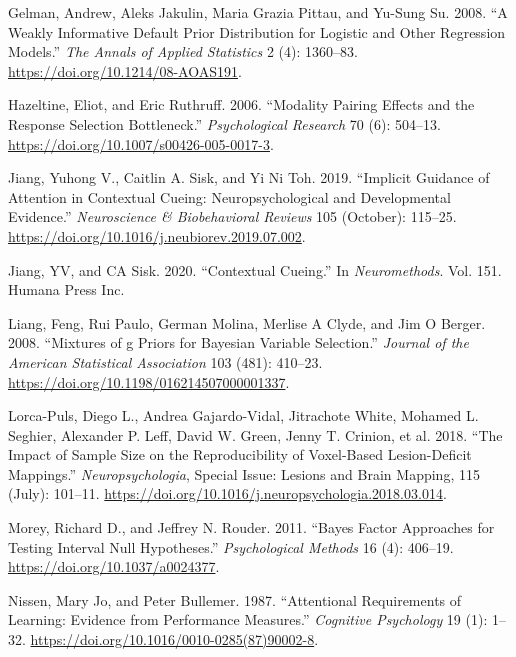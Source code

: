 \documentclass{article}
\newlength{\cslhangindent}
\newlength{\cslentryspacingunit} %
\newenvironment{CSLReferences}[2] %
 {%
  \setlength{\parindent}{0pt}
  \ifodd #1
  \let\oldpar\par
  \def\par{\hangindent=\cslhangindent\oldpar}
  \fi
  \setlength{\parskip}{#2\cslentryspacingunit}
 }%
 {}
\begin{document}
\begin{CSLReferences}{1}{0}
\leavevmode{}%
Gelman, Andrew, Aleks Jakulin, Maria Grazia Pittau, and Yu-Sung Su. 2008. {``A Weakly Informative Default Prior Distribution for Logistic and Other Regression Models.''} \emph{The Annals of Applied Statistics} 2 (4): 1360--83. \url{https://doi.org/10.1214/08-AOAS191}.

\leavevmode{}%
Hazeltine, Eliot, and Eric Ruthruff. 2006. {``Modality Pairing Effects and the Response Selection Bottleneck.''} \emph{Psychological Research} 70 (6): 504--13. \url{https://doi.org/10.1007/s00426-005-0017-3}.

\leavevmode{}%
Jiang, Yuhong V., Caitlin A. Sisk, and Yi Ni Toh. 2019. {``Implicit Guidance of Attention in Contextual Cueing: {Neuropsychological} and Developmental Evidence.''} \emph{Neuroscience \& Biobehavioral Reviews} 105 (October): 115--25. \url{https://doi.org/10.1016/j.neubiorev.2019.07.002}.

\leavevmode{}%
Jiang, YV, and CA Sisk. 2020. {``Contextual Cueing.''} In \emph{Neuromethods}. Vol. 151. Humana Press Inc.

\leavevmode{}%
Liang, Feng, Rui Paulo, German Molina, Merlise A Clyde, and Jim O Berger. 2008. {``Mixtures of g {Priors} for {Bayesian} {Variable} {Selection}.''} \emph{Journal of the American Statistical Association} 103 (481): 410--23. \url{https://doi.org/10.1198/016214507000001337}.

\leavevmode{}%
Lorca-Puls, Diego L., Andrea Gajardo-Vidal, Jitrachote White, Mohamed L. Seghier, Alexander P. Leff, David W. Green, Jenny T. Crinion, et al. 2018. {``The Impact of Sample Size on the Reproducibility of Voxel-Based Lesion-Deficit Mappings.''} \emph{Neuropsychologia}, Special {Issue}: {Lesions} and {Brain} {Mapping}, 115 (July): 101--11. \url{https://doi.org/10.1016/j.neuropsychologia.2018.03.014}.

\leavevmode{}%
Morey, Richard D., and Jeffrey N. Rouder. 2011. {``Bayes Factor Approaches for Testing Interval Null Hypotheses.''} \emph{Psychological Methods} 16 (4): 406--19. \url{https://doi.org/10.1037/a0024377}.

\leavevmode{}%
Nissen, Mary Jo, and Peter Bullemer. 1987. {``Attentional Requirements of Learning: {Evidence} from Performance Measures.''} \emph{Cognitive Psychology} 19 (1): 1--32. \url{https://doi.org/10.1016/0010-0285(87)90002-8}.


\end{CSLReferences}
\end{document}

